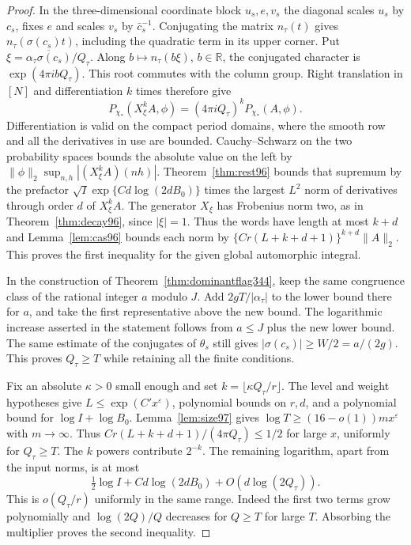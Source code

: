 \documentclass[a4paper,11pt]{article}
\theoremstyle{definition}
\theoremstyle{remark}
\newcommand{\RR}{\mathbb R}\newcommand{\CC}{\mathbb C}\newcommand{\QQ}{\mathbb Q}
\numberwithin{equation}{section}
\begin{document}
\begin{proof}
In the three-dimensional coordinate block $u_s,e,v_s$ the
diagonal scales $u_s$ by $c_s$, fixes $e$ and scales $v_s$ by
$\bar c_s^{-1}$. Conjugating the matrix $n_\tau(t)$ gives
$n_\tau(\sigma(c_s)t)$, including the quadratic term in its
upper corner. Put $\xi=\overline{\alpha_\tau\sigma(c_s)}/Q_\tau$.
Along $b\mapsto n_\tau(b\xi)$, $b\in\RR$, the conjugated character
is $\exp(4\pi i b Q_\tau)$. This root commutes with the column
group. Right translation in $[N]$ and differentiation $k$ times
therefore give
\[
        P_{\chi_*}(X_\xi^k A,\phi)
                    =(4\pi i Q_\tau)^k P_{\chi_*}(A,\phi).
\]
Differentiation is valid on the compact period domains, where the
smooth row and all the derivatives in use are bounded. Cauchy--Schwarz
on the two probability spaces bounds the absolute value on the
left by $\|\phi\|_2\sup_{n,h}|(X_\xi^k A)(nh)|$.
Theorem~\ref{thm:rest96} bounds that supremum by the prefactor
$\sqrt I\exp\{C d\log(2d B_0)\}$ times the largest $L^2$ norm
of derivatives through order $d$ of $X_\xi^k A$. The generator
$X_\xi$ has Frobenius norm two, as in Theorem~\ref{thm:decay96},
since $|\xi|=1$. Thus the words have length at most $k+d$ and
Lemma~\ref{lem:cas96} bounds each norm by
$\{Cr(L+k+d+1)\}^{k+d}\|A\|_2$. This proves the first inequality
for the given global automorphic integral.

In the construction of Theorem~\ref{thm:dominantflag344}, keep the
same congruence class of the rational integer $a$ modulo $J$.
Add $2gT/|\alpha_\tau|$ to the lower bound there for $a$, and take
the first representative above the new bound. The logarithmic
increase asserted in the statement follows from $a\le J$ plus
the new lower bound. The same estimate of the conjugates of
$\theta_s$ still gives $|\sigma(c_s)|\ge W/2=a/(2g)$. This proves
$Q_\tau\ge T$ while retaining all the finite conditions.

Fix an absolute $\kappa>0$ small enough and set
$k=\lfloor\kappa Q_\tau/r\rfloor$. The level and weight hypotheses
give $L\le\exp(C' x^\varepsilon)$, polynomial bounds on $r,d$,
and a polynomial bound for $\log I+\log B_0$.
Lemma~\ref{lem:size97} gives
$\log T\ge(16-o(1))m x^\varepsilon$ with $m\to\infty$.
Thus $Cr(L+k+d+1)/(4\pi Q_\tau)\le1/2$ for large $x$, uniformly
for $Q_\tau\ge T$. The $k$ powers contribute $2^{-k}$. The remaining
logarithm, apart from the input norms, is at most
\[
             \tfrac12\log I+C d\log(2d B_0)+O(d\log(2Q_\tau)).
\]
This is $o(Q_\tau/r)$ uniformly in the same range. Indeed the
first two terms grow polynomially and $\log(2Q)/Q$ decreases
for $Q\ge T$ for large $T$. Absorbing the multiplier proves the
second inequality.
\end{proof}
\end{document}

